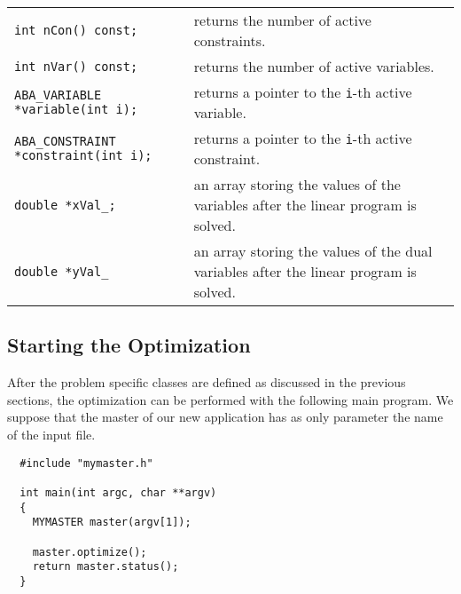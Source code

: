 \noindent
\begin{tabular}{lp{}}
{\tt int nCon() const;}   &returns the number of active constraints.\\
{\tt int nVar() const;}   &returns the number of active variables.\\
{\tt ABA\_VARIABLE *variable(int i);} &returns a pointer to the {\tt i}-th active
                                 variable.\\
{\tt ABA\_CONSTRAINT *constraint(int i);} &returns a pointer to the {\tt i}-th active
                                     constraint.\\
{\tt double *xVal\_;}                &an array storing the values
                                     of the variables after the
                                     linear program is solved.\\
{\tt double *yVal\_}                 &an array storing the values
                                     of the dual variables after the
                                     linear program is solved.\\
\end{tabular}


\subsection{Starting the Optimization}

After the problem specific classes are defined as discussed in the previous
sections, the optimization can be performed with the following main
program. We suppose that the master of our new application has as
only parameter the name of the input file.
\begin{verbatim}
  #include "mymaster.h"
  
  int main(int argc, char **argv)
  {
    MYMASTER master(argv[1]);
  
    master.optimize();
    return master.status();
  }
\end{verbatim}
